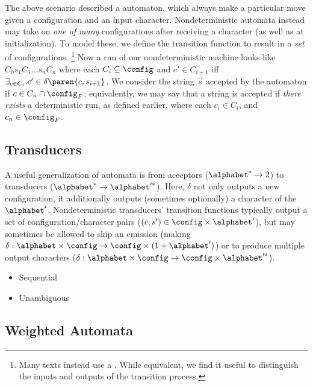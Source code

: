 The above scenario described a  automaton, which always
make a particular move given a configuration and an input character.
Nondeterministic automata instead may take on {\em one of many}
configurations after receiving a character (as well as at initialization).
To model these, we define the transition function to result in a {\em set}
of configurations.%
%
\footnote{Many texts instead use a .  While
equivalent, we find it useful to distinguish the inputs and outputs of the
transition process.}
%
Now a run of our nondeterministic machine looks like $C_0 s_1 C_1 \ldots s_n
C_n$ where each $C_i \subseteq \config$ and $c' \in C_{i+1}$ iff $\exists_{c
\in C_i} . c' \in \delta\paren{c,s_{i+1}}$.  We consider the string
$\vec{s}$ accepted by the automaton if $c \in C_n \cap \config_F$;
equivalently, we may say that a string is accepted if {\em there exists} a
deterministic run, as defined earlier, where each $c_i \in C_i$, and $c_n
\in \config_F$.

\subsection{Transducers}

A useful generalization of automata is from acceptors ($\alphabet^* \to 2$) to
transducers ($\alphabet^* \to \alphabet'^*$).  Here, $\delta$ not only outputs a
new configuration, it additionally outputs (sometimes optionally) a
character of the  $\alphabet'$.  Nondeterministic
transducers' transition functions typically output a set of
configuration/character pairs ($(c, s') \in \config \times \alphabet'$), but
may sometimes be allowed to skip an emission (making $\delta : \alphabet \times
\config \to \config \times (1+\alphabet')$) or to produce multiple output
characters (\eg $\delta : \alphabet \times \config \to \config \times
\alphabet'^*$).

\begin{itemize}
  \item Sequential
  \item Unambiguous
\end{itemize}

\subsection{Weighted Automata}


